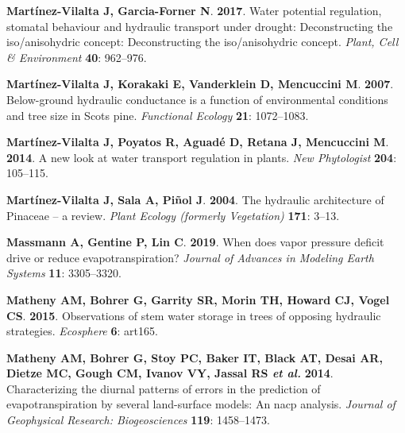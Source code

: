 \documentclass[11pt,twoside]{reedthesis}
\begin{document}
\hypertarget{ref-martinez-vilalta_water_2017}{}
\textbf{\textnormal{Martínez-Vilalta J}, \textnormal{Garcia-Forner N}}.
\textbf{2017}. Water potential regulation, stomatal behaviour and
hydraulic transport under drought: Deconstructing the iso/anisohydric
concept: Deconstructing the iso/anisohydric concept. \emph{Plant, Cell
\& Environment} \textbf{40}: 962--976.

\hypertarget{ref-Martinez-Vilalta2007}{}
\textbf{\textnormal{Martínez-Vilalta J}, \textnormal{Korakaki E},
\textnormal{Vanderklein D}, \textnormal{Mencuccini M}}. \textbf{2007}.
Below-ground hydraulic conductance is a function of environmental
conditions and tree size in Scots pine. \emph{Functional Ecology}
\textbf{21}: 1072--1083.

\hypertarget{ref-martinez-vilalta_new_2014}{}
\textbf{\textnormal{Martínez-Vilalta J}, \textnormal{Poyatos R},
\textnormal{Aguadé D}, \textnormal{Retana J}, \textnormal{Mencuccini
M}}. \textbf{2014}. A new look at water transport regulation in plants.
\emph{New Phytologist} \textbf{204}: 105--115.

\hypertarget{ref-martinez-vilalta_hydraulic_2004}{}
\textbf{\textnormal{Martínez-Vilalta J}, \textnormal{Sala A},
\textnormal{Piñol J}}. \textbf{2004}. The hydraulic architecture of
Pinaceae -- a review. \emph{Plant Ecology (formerly Vegetation)}
\textbf{171}: 3--13.

\hypertarget{ref-Massmann2019}{}
\textbf{\textnormal{Massmann A}, \textnormal{Gentine P}, \textnormal{Lin
C}}. \textbf{2019}. When does vapor pressure deficit drive or reduce
evapotranspiration? \emph{Journal of Advances in Modeling Earth Systems}
\textbf{11}: 3305--3320.

\hypertarget{ref-matheny_observations_2015}{}
\textbf{\textnormal{Matheny AM}, \textnormal{Bohrer G},
\textnormal{Garrity SR}, \textnormal{Morin TH}, \textnormal{Howard CJ},
\textnormal{Vogel CS}}. \textbf{2015}. Observations of stem water
storage in trees of opposing hydraulic strategies. \emph{Ecosphere}
\textbf{6}: art165.

\hypertarget{ref-Matheny2014}{}
\textbf{\textnormal{Matheny AM}, \textnormal{Bohrer G}, \textnormal{Stoy
PC}, \textnormal{Baker IT}, \textnormal{Black AT}, \textnormal{Desai
AR}, \textnormal{Dietze MC}, \textnormal{Gough CM}, \textnormal{Ivanov
VY}, \textnormal{Jassal RS} \emph{et al.}} \textbf{2014}. Characterizing
the diurnal patterns of errors in the prediction of evapotranspiration
by several land-surface models: An nacp analysis. \emph{Journal of
Geophysical Research: Biogeosciences} \textbf{119}: 1458--1473.
\end{document}
